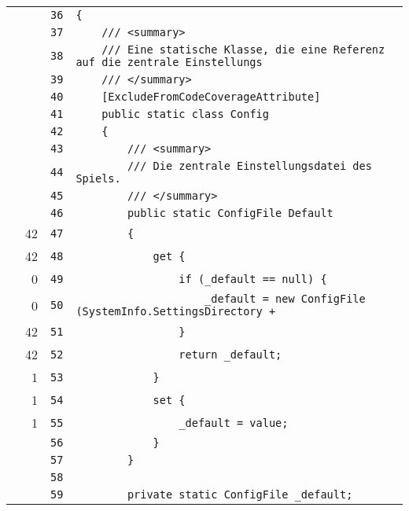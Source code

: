 \documentclass[a4paper,10pt]{article}
\begin{document}
\begin{longtable}[l]{lrrl}
\cellcolor{gray} &  & \verb~36~ & \verb~{~\\
\cellcolor{gray} &  & \verb~37~ & \verb~    /// <summary>~\\
\cellcolor{gray} &  & \verb~38~ & \verb~    /// Eine statische Klasse, die eine Referenz auf die zentrale Einstellungs~\\
\cellcolor{gray} &  & \verb~39~ & \verb~    /// </summary>~\\
\cellcolor{gray} &  & \verb~40~ & \verb~    [ExcludeFromCodeCoverageAttribute]~\\
\cellcolor{gray} &  & \verb~41~ & \verb~    public static class Config~\\
\cellcolor{gray} &  & \verb~42~ & \verb~    {~\\
\cellcolor{gray} &  & \verb~43~ & \verb~        /// <summary>~\\
\cellcolor{gray} &  & \verb~44~ & \verb~        /// Die zentrale Einstellungsdatei des Spiels.~\\
\cellcolor{gray} &  & \verb~45~ & \verb~        /// </summary>~\\
\cellcolor{gray} &  & \verb~46~ & \verb~        public static ConfigFile Default~\\
\cellcolor{green} & 42 & \verb~47~ & \verb~        {~\\
\cellcolor{green} & 42 & \verb~48~ & \verb~            get {~\\
\cellcolor{red} & 0 & \verb~49~ & \verb~                if (_default == null) {~\\
\cellcolor{red} & 0 & \verb~50~ & \verb~                    _default = new ConfigFile (SystemInfo.SettingsDirectory + ~\\
\cellcolor{green} & 42 & \verb~51~ & \verb~                }~\\
\cellcolor{green} & 42 & \verb~52~ & \verb~                return _default;~\\
\cellcolor{green} & 1 & \verb~53~ & \verb~            }~\\
\cellcolor{green} & 1 & \verb~54~ & \verb~            set {~\\
\cellcolor{green} & 1 & \verb~55~ & \verb~                _default = value;~\\
\cellcolor{gray} &  & \verb~56~ & \verb~            }~\\
\cellcolor{gray} &  & \verb~57~ & \verb~        }~\\
\cellcolor{gray} &  & \verb~58~ & \verb~~\\
\cellcolor{gray} &  & \verb~59~ & \verb~        private static ConfigFile _default;~\\

\end{longtable}
\end{document}
